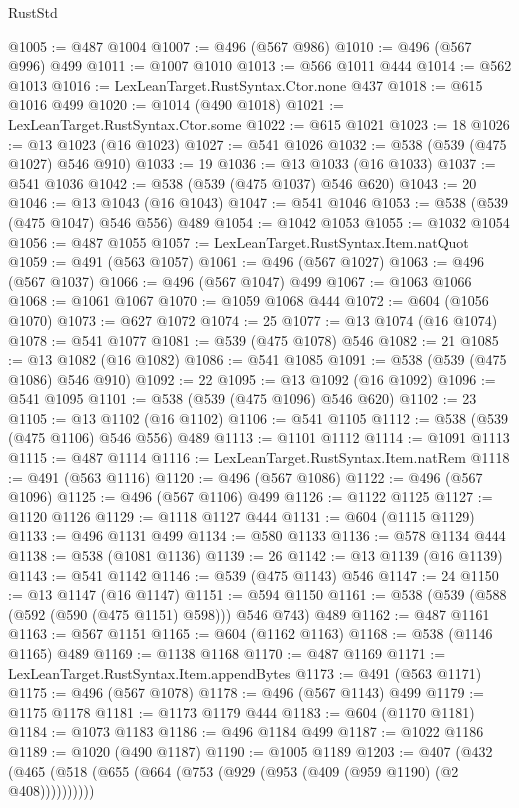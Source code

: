 \begin{lexlean}{RustStd}
\begin{coremodule}
{\begin{coremodule}
{{{{{{{{{{{@1005 := @487 @1004
@1007 := @496 (@567 @986)
@1010 := @496 (@567 @996) @499
@1011 := @1007 @1010
@1013 := @566 @1011 @444
@1014 := @562 @1013
@1016 := LexLeanTarget.RustSyntax.Ctor.none @437
@1018 := @615 @1016 @499
@1020 := @1014 (@490 @1018)
@1021 := LexLeanTarget.RustSyntax.Ctor.some
@1022 := @615 @1021
@1023 := 18
@1026 := @13 @1023 (@16 @1023)
@1027 := @541 @1026
@1032 := @538 (@539 (@475 @1027) @546 @910)
@1033 := 19
@1036 := @13 @1033 (@16 @1033)
@1037 := @541 @1036
@1042 := @538 (@539 (@475 @1037) @546 @620)
@1043 := 20
@1046 := @13 @1043 (@16 @1043)
@1047 := @541 @1046
@1053 := @538 (@539 (@475 @1047) @546 @556) @489
@1054 := @1042 @1053
@1055 := @1032 @1054
@1056 := @487 @1055
@1057 := LexLeanTarget.RustSyntax.Item.natQuot
@1059 := @491 (@563 @1057)
@1061 := @496 (@567 @1027)
@1063 := @496 (@567 @1037)
@1066 := @496 (@567 @1047) @499
@1067 := @1063 @1066
@1068 := @1061 @1067
@1070 := @1059 @1068 @444
@1072 := @604 (@1056 @1070)
@1073 := @627 @1072
@1074 := 25
@1077 := @13 @1074 (@16 @1074)
@1078 := @541 @1077
@1081 := @539 (@475 @1078) @546
@1082 := 21
@1085 := @13 @1082 (@16 @1082)
@1086 := @541 @1085
@1091 := @538 (@539 (@475 @1086) @546 @910)
@1092 := 22
@1095 := @13 @1092 (@16 @1092)
@1096 := @541 @1095
@1101 := @538 (@539 (@475 @1096) @546 @620)
@1102 := 23
@1105 := @13 @1102 (@16 @1102)
@1106 := @541 @1105
@1112 := @538 (@539 (@475 @1106) @546 @556) @489
@1113 := @1101 @1112
@1114 := @1091 @1113
@1115 := @487 @1114
@1116 := LexLeanTarget.RustSyntax.Item.natRem
@1118 := @491 (@563 @1116)
@1120 := @496 (@567 @1086)
@1122 := @496 (@567 @1096)
@1125 := @496 (@567 @1106) @499
@1126 := @1122 @1125
@1127 := @1120 @1126
@1129 := @1118 @1127 @444
@1131 := @604 (@1115 @1129)
@1133 := @496 @1131 @499
@1134 := @580 @1133
@1136 := @578 @1134 @444
@1138 := @538 (@1081 @1136)
@1139 := 26
@1142 := @13 @1139 (@16 @1139)
@1143 := @541 @1142
@1146 := @539 (@475 @1143) @546
@1147 := 24
@1150 := @13 @1147 (@16 @1147)
@1151 := @594 @1150
@1161 := @538 (@539 (@588 (@592 (@590 (@475 @1151) @598))) @546 @743) @489
@1162 := @487 @1161
@1163 := @567 @1151
@1165 := @604 (@1162 @1163)
@1168 := @538 (@1146 @1165) @489
@1169 := @1138 @1168
@1170 := @487 @1169
@1171 := LexLeanTarget.RustSyntax.Item.appendBytes
@1173 := @491 (@563 @1171)
@1175 := @496 (@567 @1078)
@1178 := @496 (@567 @1143) @499
@1179 := @1175 @1178
@1181 := @1173 @1179 @444
@1183 := @604 (@1170 @1181)
@1184 := @1073 @1183
@1186 := @496 @1184 @499
@1187 := @1022 @1186
@1189 := @1020 (@490 @1187)
@1190 := @1005 @1189
@1203 := @407 (@432 (@465 (@518 (@655 (@664 (@753 (@929 (@953 (@409 (@959 @1190) (@2 @408))))))))))
}}}}}}}}}}}
\end{coremodule}}
\end{coremodule}
\end{lexlean}
